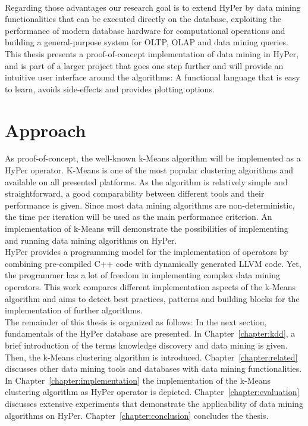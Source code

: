 \\
Regarding those advantages our research goal is to extend HyPer by data mining functionalities that can be executed directly on the database, exploiting the performance of modern database hardware for computational operations and building a general-purpose system for OLTP, OLAP and data mining queries. This thesis presents a proof-of-concept implementation of data mining in HyPer, and is part of a larger project that goes one step further and will provide an intuitive user interface around the algorithms: A functional language that is easy to learn, avoids side-effects and provides plotting options. 


\section{Approach}
As proof-of-concept, the well-known k-Means algorithm will be implemented as a HyPer operator. K-Means is one of the most popular  clustering algorithms and available on all presented platforms. As the algorithm is relatively simple and straightforward, a good comparability between different tools and their performance is given. Since most data mining algorithms are non-deterministic, the time per iteration will be used as the main performance criterion. An implementation of k-Means will demonstrate the possibilities of implementing and running data mining algorithms on HyPer.
\\
HyPer provides a programming model for the implementation of operators by combining pre-compiled C++ code with dynamically generated LLVM code. Yet, the programmer has a lot of freedom in implementing complex data mining operators. This work compares different implementation aspects of the k-Means algorithm and aims to detect best practices, patterns and building blocks for the implementation of further algorithms.
\\
The remainder of this thesis is organized as follows: In the next section, fundamentals of the HyPer database are presented. In Chapter~\ref{chapter:kdd}, a brief introduction of the terms knowledge discovery and data mining is given. Then, the k-Means clustering algorithm is introduced. Chapter~\ref{chapter:related} discusses other data mining tools and databases with data mining functionalities. In Chapter~\ref{chapter:implementation} the implementation of the k-Means clustering algorithm as HyPer operator is depicted. Chapter~\ref{chapter:evaluation} discusses extensive experiments that demonstrate the applicability of data mining algorithms on HyPer. Chapter~\ref{chapter:conclusion} concludes the thesis.




